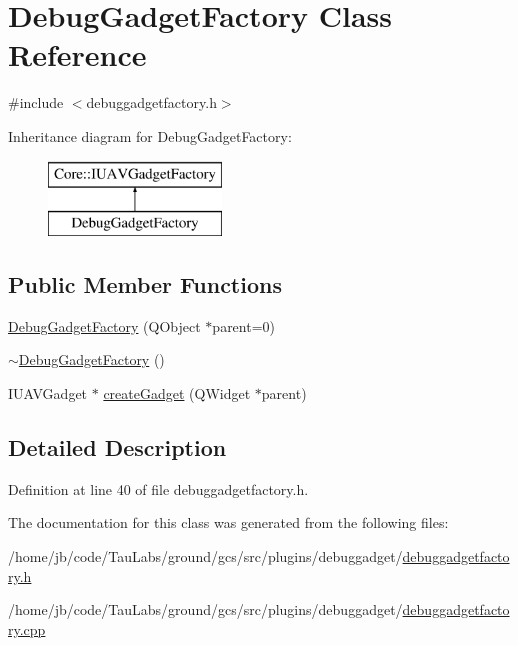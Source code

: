 \hypertarget{class_debug_gadget_factory}{\section{\-Debug\-Gadget\-Factory \-Class \-Reference}
\label{class_debug_gadget_factory}
}


{\ttfamily \#include $<$debuggadgetfactory.\-h$>$}

\-Inheritance diagram for \-Debug\-Gadget\-Factory\-:\begin{figure}[H]
\begin{center}
\leavevmode
\includegraphics[height=2.000000cm]{class_debug_gadget_factory}
\end{center}
\end{figure}
\subsection*{\-Public \-Member \-Functions}
\begin{DoxyCompactItemize}
\item 
\hyperlink{group___debug_gadget_plugin_ga48259f8b08f0767ab22c4b022643e134}{\-Debug\-Gadget\-Factory} (\-Q\-Object $\ast$parent=0)
\item 
\hyperlink{group___debug_gadget_plugin_gadb2d9eecc3b92fc56cf849ffd7230e91}{$\sim$\-Debug\-Gadget\-Factory} ()
\item 
\-I\-U\-A\-V\-Gadget $\ast$ \hyperlink{group___debug_gadget_plugin_ga24e00530d01c4d1874ac8395caa2370c}{create\-Gadget} (\-Q\-Widget $\ast$parent)
\end{DoxyCompactItemize}


\subsection{\-Detailed \-Description}


\-Definition at line 40 of file debuggadgetfactory.\-h.



\-The documentation for this class was generated from the following files\-:\begin{DoxyCompactItemize}
\item 
/home/jb/code/\-Tau\-Labs/ground/gcs/src/plugins/debuggadget/\hyperlink{debuggadgetfactory_8h}{debuggadgetfactory.\-h}\item 
/home/jb/code/\-Tau\-Labs/ground/gcs/src/plugins/debuggadget/\hyperlink{debuggadgetfactory_8cpp}{debuggadgetfactory.\-cpp}\end{DoxyCompactItemize}
